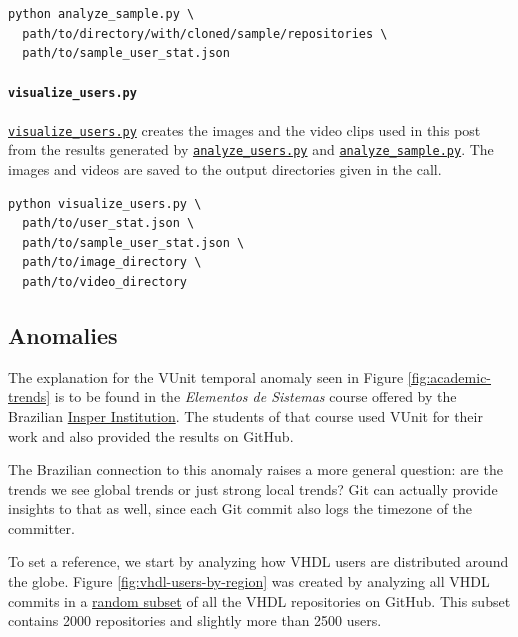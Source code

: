 \documentclass[]{article}
\let\oldparagraph\paragraph
\renewcommand{\paragraph}[1]{\oldparagraph{#1}\mbox{}}
\begin{document}
\begin{verbatim}
python analyze_sample.py \
  path/to/directory/with/cloned/sample/repositories \
  path/to/sample_user_stat.json
\end{verbatim}

\hypertarget{visualize-users}{%
\paragraph{\texorpdfstring{\texttt{visualize\_users.py}}{visualize\_users.py}}\label{visualize-users}}

\href{https://github.com/LarsAsplund/github-facts/tree/main/py/visualize_users.py}{\texttt{visualize\_users.py}} creates the images and the video clips used in this post from the results generated by \href{https://github.com/LarsAsplund/github-facts/tree/main/py/analyze_users.py}{\texttt{analyze\_users.py}} and \href{https://github.com/LarsAsplund/github-facts/tree/main/py/analyze_sample.py}{\texttt{analyze\_sample.py}}. The images and videos are saved to the output directories given in the call.

\begin{verbatim}
python visualize_users.py \
  path/to/user_stat.json \
  path/to/sample_user_stat.json \
  path/to/image_directory \
  path/to/video_directory
\end{verbatim}

\hypertarget{anomalies}{%
\subsection{Anomalies}\label{anomalies}}

The explanation for the VUnit temporal anomaly seen in Figure \ref{fig:academic-trends} is to be found in the \emph{Elementos de Sistemas} course offered by the Brazilian \href{https://www.insper.edu.br/}{Insper Institution}. The students of that course used VUnit for their work and also provided the results on GitHub.

The Brazilian connection to this anomaly raises a more general question: are the trends we see global trends or just strong local trends? Git can actually provide insights to that as well, since each Git commit also logs the timezone of the committer.

To set a reference, we start by analyzing how VHDL users are distributed around the globe. Figure \ref{fig:vhdl-users-by-region} was created by analyzing all VHDL commits in a \href{https://github.com/LarsAsplund/github-facts/tree/main/sample_repos.txt}{random subset} of all the VHDL repositories on GitHub. This subset contains 2000 repositories and slightly more than 2500 users.
\end{document}
